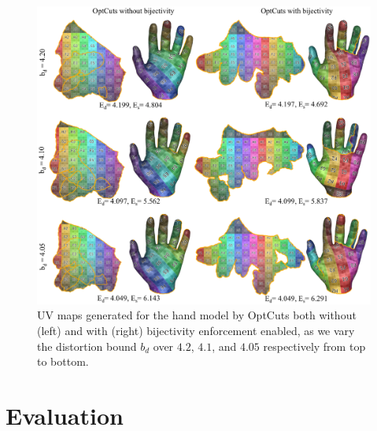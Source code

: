 \begin{figure}[t]
\centering
\includegraphics[width=\linewidth]{fig/our_impressive_results_left.png}
\vspace{-.5cm}
\caption{UV maps generated for the hand model by OptCuts both without (left) and with (right) bijectivity enforcement enabled, as we vary the distortion bound $b_d$ over $4.2$, $4.1$, and $4.05$ respectively from top to bottom.}
\vspace{-0.2cm}
\label{fig:ours_various_bounds}
\end{figure}

\section{Evaluation}
\label{sec:results}


